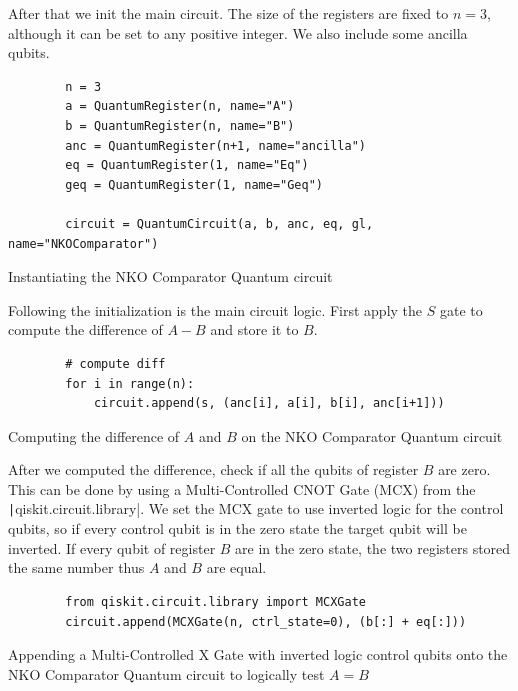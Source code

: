 After that we init the main circuit. The size of the registers are fixed to $n=3$, although it can
be set to any positive integer. We also include some ancilla qubits.

\begin{listing}[ht]
    \centering
    \begin{verbatim}
        n = 3
        a = QuantumRegister(n, name="A")
        b = QuantumRegister(n, name="B")
        anc = QuantumRegister(n+1, name="ancilla")
        eq = QuantumRegister(1, name="Eq")
        geq = QuantumRegister(1, name="Geq")

        circuit = QuantumCircuit(a, b, anc, eq, gl, name="NKOComparator")
    \end{verbatim}
    \caption{Instantiating the NKO Comparator Quantum circuit}
\end{listing}

\newpage

Following the initialization is the main circuit logic. First apply the $S$ gate to compute
the difference of $A-B$ and store it to $B$.

\begin{listing}[ht]
    \centering
    \begin{verbatim}
        # compute diff
        for i in range(n):
            circuit.append(s, (anc[i], a[i], b[i], anc[i+1]))
    \end{verbatim}
    \caption{Computing the difference of $A$ and $B$ on the NKO Comparator Quantum circuit}
\end{listing}

After we computed the difference, check if all the qubits of register $B$ are zero.
This can be done by using a Multi-Controlled CNOT Gate (MCX) from the \texttt|qiskit.circuit.library|.
We set the MCX gate to use inverted logic for the control qubits, so if every control qubit is in the zero state
the target qubit will be inverted. If every qubit of register $B$ are in the zero state, the two registers stored
the same number thus $A$ and $B$ are equal.

\begin{listing}[ht]
    \centering
    \begin{verbatim}
        from qiskit.circuit.library import MCXGate
        circuit.append(MCXGate(n, ctrl_state=0), (b[:] + eq[:]))
    \end{verbatim}
    \caption{Appending a Multi-Controlled X Gate with inverted logic control qubits onto the NKO Comparator Quantum circuit to logically test $A = B$}
\end{listing}

